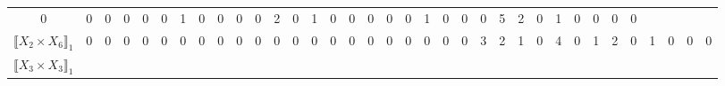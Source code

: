 \documentclass[12pt]{article}
\theoremstyle{definition}
\theoremstyle{remark}
\begin{document}
{\begin{table}[H]
\begin{adjustbox}{angle=90}
{\begin{tabular}{c||c|c|c|c|c|c|c|c|c|c|c|c|c|c|c|c|c|c|c|c|c|c|c|c|c|c|c|c|c|c|c|c|c|c}
0  & %
0  & %
0  & %
0  & %
0  & %
0  & %
1  & %
0  & %
0  & %
0  & %
0  & %
2  & %
0  & %
1  & %
0  & %
0  & %
0  & %
0  & %
0  & %
1  & %
0  & %
0  & %
0  & %
5  & %
2  & %
0  & %
1  & %
0  & %
0  & %
0  & %
0   %
\\
$\llbracket X_2 \times X_6 \rrbracket_1$ &
0  & %
0  & %
0  & %
0  & %
0  & %
0  & %
0  & %
0  & %
0  & %
0  & %
0  & %
0  & %
0  & %
0  & %
0  & %
0  & %
0  & %
0  & %
0  & %
0  & %
0  & %
3  & %
2  & %
1  & %
0  & %
4  & %
0  & %
1  & %
2  & %
0  & %
1  & %
0  & %
0  & %
0   %
\\
$\llbracket X_3 \times X_3 \rrbracket_1$ &

\end{tabular}}
\end{adjustbox}
\end{table}}
\end{document}
